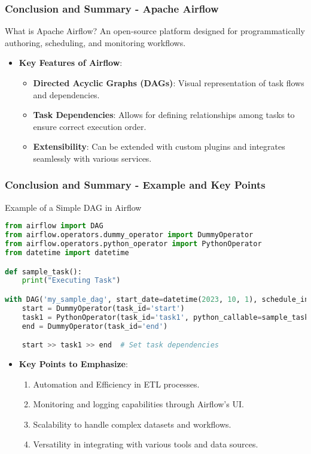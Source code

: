 \documentclass[aspectratio=169]{beamer}
\begin{document}
\begin{frame}[fragile]
  \frametitle{Conclusion and Summary - Apache Airflow}
  \begin{block}{What is Apache Airflow?}
    An open-source platform designed for programmatically authoring, scheduling, and monitoring workflows.
  \end{block}
  
  \begin{itemize}
    \item \textbf{Key Features of Airflow}:
      \begin{itemize}
        \item \textbf{Directed Acyclic Graphs (DAGs)}: Visual representation of task flows and dependencies.
        \item \textbf{Task Dependencies}: Allows for defining relationships among tasks to ensure correct execution order.
        \item \textbf{Extensibility}: Can be extended with custom plugins and integrates seamlessly with various services.
      \end{itemize}
  \end{itemize}
\end{frame}

\begin{frame}[fragile]
  \frametitle{Conclusion and Summary - Example and Key Points}
  \begin{block}{Example of a Simple DAG in Airflow}
  \begin{lstlisting}[language=Python]
from airflow import DAG
from airflow.operators.dummy_operator import DummyOperator
from airflow.operators.python_operator import PythonOperator
from datetime import datetime

def sample_task():
    print("Executing Task")

with DAG('my_sample_dag', start_date=datetime(2023, 10, 1), schedule_interval='@daily') as dag:
    start = DummyOperator(task_id='start')
    task1 = PythonOperator(task_id='task1', python_callable=sample_task)
    end = DummyOperator(task_id='end')

    start >> task1 >> end  # Set task dependencies
  \end{lstlisting}
  \end{block}

  \begin{itemize}
    \item \textbf{Key Points to Emphasize}:
      \begin{enumerate}
        \item Automation and Efficiency in ETL processes.
        \item Monitoring and logging capabilities through Airflow's UI.
        \item Scalability to handle complex datasets and workflows.
        \item Versatility in integrating with various tools and data sources.
      \end{enumerate}
  \end{itemize}
\end{frame}
\end{document}
